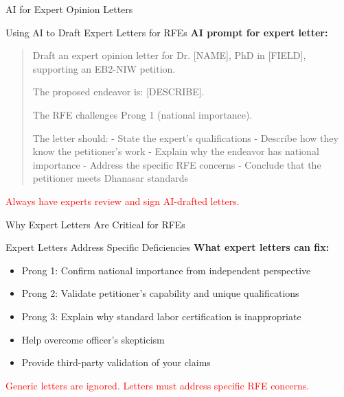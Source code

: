 \documentclass[11pt]{beamer}
\begin{document}
	\begin{frame}{AI for Expert Opinion Letters}
		\scriptsize
		\begin{block}{Using AI to Draft Expert Letters for RFEs}
			\textbf{AI prompt for expert letter:}
			\begin{quote}
				Draft an expert opinion letter for Dr. [NAME], PhD in [FIELD], supporting an EB2-NIW petition.
				
				The proposed endeavor is: [DESCRIBE].
				
				The RFE challenges Prong 1 (national importance).
				
				The letter should:
				- State the expert's qualifications
				- Describe how they know the petitioner's work
				- Explain why the endeavor has national importance
				- Address the specific RFE concerns
				- Conclude that the petitioner meets Dhanasar standards
			\end{quote}
			\textcolor{red}{Always have experts review and sign AI-drafted letters.}
		\end{block}
	\end{frame}
	
	
	\begin{frame}{Why Expert Letters Are Critical for RFEs}
		\scriptsize
		\begin{block}{Expert Letters Address Specific Deficiencies}
			\textbf{What expert letters can fix:}
			\begin{itemize}
				\item Prong 1: Confirm national importance from independent perspective
				\item Prong 2: Validate petitioner's capability and unique qualifications
				\item Prong 3: Explain why standard labor certification is inappropriate
				\item Help overcome officer's skepticism
				\item Provide third-party validation of your claims
			\end{itemize}
			\textcolor{red}{Generic letters are ignored. Letters must address specific RFE concerns.}
		\end{block}
	\end{frame}
	
\end{document}
